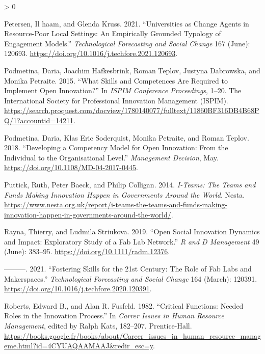 \documentclass[AMA,STIX1COL,APA,STIX2COL]{WileyNJD-v2}
\newlength{\cslhangindent}
\newenvironment{CSLReferences}[2] %
 {%
  \setlength{\parindent}{0pt}
  \ifodd #1 \everypar{\setlength{\hangindent}{\cslhangindent}}\ignorespaces\fi
  \ifnum #2 > 0
  \setlength{\parskip}{#2\baselineskip}
  \fi
 }%
 {}
\begin{document}
\begin{CSLReferences}{1}{0}
\leavevmode\hypertarget{ref-Petersen2021}{}%
Petersen, Il haam, and Glenda Kruss. 2021. {``Universities as Change
Agents in Resource-Poor Local Settings: An Empirically Grounded Typology
of Engagement Models.''} \emph{Technological Forecasting and Social
Change} 167 (June): 120693.
\url{https://doi.org/10.1016/j.techfore.2021.120693}.

\leavevmode\hypertarget{ref-Podmetina2015}{}%
Podmetina, Daria, Joachim Hafkesbrink, Roman Teplov, Justyna Dabrowska,
and Monika Petraite. 2015. {``What Skills and Competences Are Required
to Implement Open Innovation?''} In \emph{ISPIM Conference Proceedings},
1--20. The International Society for Professional Innovation Management
(ISPIM).
\url{https://search.proquest.com/docview/1780140077/fulltext/11860BF316DB4B68PQ/1?accountid=14211}.

\leavevmode\hypertarget{ref-Podmetina2018}{}%
Podmetina, Daria, Klas Eric Soderquist, Monika Petraite, and Roman
Teplov. 2018. {``Developing a Competency Model for Open Innovation: From
the Individual to the Organisational Level.''} \emph{Management
Decision}, May. \url{https://doi.org/10.1108/MD-04-2017-0445}.

\leavevmode\hypertarget{ref-Puttick2014-Teams}{}%
Puttick, Ruth, Peter Baeck, and Philip Colligan. 2014. \emph{I-Teams:
The Teams and Funds Making Innovation Happen in Governments Around the
World}. Nesta.
\url{https://www.nesta.org.uk/report/i-teams-the-teams-and-funds-making-innovation-happen-in-governments-around-the-world/}.

\leavevmode\hypertarget{ref-Rayna2019}{}%
Rayna, Thierry, and Ludmila Striukova. 2019. {``Open Social Innovation
Dynamics and Impact: Exploratory Study of a Fab Lab Network.''} \emph{R
and D Management} 49 (June): 383--95.
\url{https://doi.org/10.1111/radm.12376}.

\leavevmode\hypertarget{ref-Rayna2021}{}%
---------. 2021. {``Fostering Skills for the 21st Century: The Role of
Fab Labs and Makerspaces.''} \emph{Technological Forecasting and Social
Change} 164 (March): 120391.
\url{https://doi.org/10.1016/j.techfore.2020.120391}.

\leavevmode\hypertarget{ref-Roberts1982}{}%
Roberts, Edward B., and Alan R. Fusfeld. 1982. {``Critical Functions:
Needed Roles in the Innovation Process.''} In \emph{Carrer Issues in
Human Resource Management}, edited by Ralph Kats, 182--207.
Prentice-Hall.
\url{https://books.google.fr/books/about/Career_issues_in_human_resource_manageme.html?id=4CYUAQAAMAAJ\&redir_esc=y}.


\end{CSLReferences}
\end{document}
